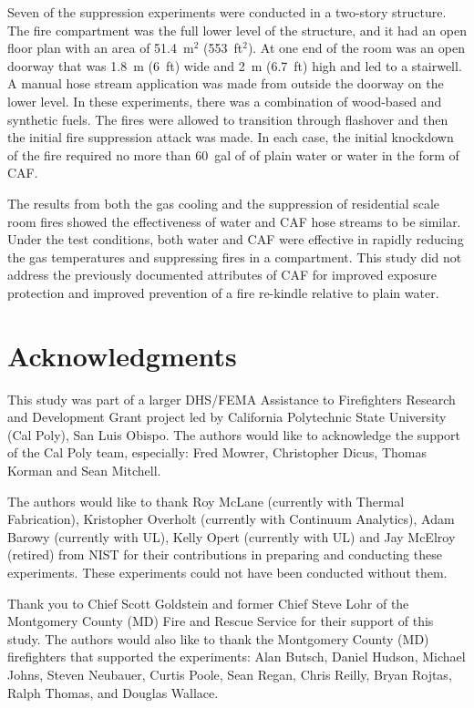 \documentclass[12pt,oneside]{book}
\begin{document}
Seven of the suppression experiments were conducted in a two-story structure.  The fire compartment was the full lower level of the structure, and it had an open floor plan with an area of 51.4~m$^2$ (553~ft$^2$). At one end of the room was an open doorway that was 1.8~m (6~ft) wide and 2~m (6.7~ft) high and led to a stairwell. A manual hose stream application was made from outside the doorway on the lower level. In these experiments, there was a combination of wood-based and synthetic fuels. The fires were allowed to transition through flashover and then the initial fire suppression attack was made. In each case, the initial knockdown of the fire required no more than 60~gal of of plain water or water in the form of CAF.   

The results from both the gas cooling and the suppression of residential scale room fires showed the effectiveness of water and CAF hose streams to be similar. Under the test conditions, both water and CAF were effective in rapidly reducing the gas temperatures and suppressing fires in a compartment.  This study did not address the previously documented attributes of CAF for improved exposure protection and improved prevention of a fire re-kindle relative to plain water. 


\chapter{Acknowledgments}
\label{chap:acknowledgments}

This study was part of a larger DHS/FEMA Assistance to Firefighters Research and Development Grant project led by California Polytechnic State University (Cal Poly), San Luis Obispo. The authors would like to acknowledge the support of the Cal Poly team, especially: Fred Mowrer, Christopher Dicus, Thomas Korman and Sean Mitchell.

The authors would like to thank Roy McLane (currently with Thermal Fabrication), Kristopher Overholt (currently with Continuum Analytics), Adam Barowy (currently with UL), Kelly Opert (currently with UL) and Jay McElroy (retired) from NIST for their contributions in preparing and conducting these experiments. These experiments could not have been conducted without them. 

Thank you to Chief Scott Goldstein and former Chief Steve Lohr of the Montgomery County (MD) Fire and Rescue Service for their support of this study. The authors would also like to thank the Montgomery County (MD) firefighters that supported the experiments: Alan Butsch, Daniel Hudson, Michael Johns, Steven Neubauer, Curtis Poole, Sean Regan, Chris Reilly, Bryan Rojtas, Ralph Thomas, and Douglas Wallace. 
\end{document}
